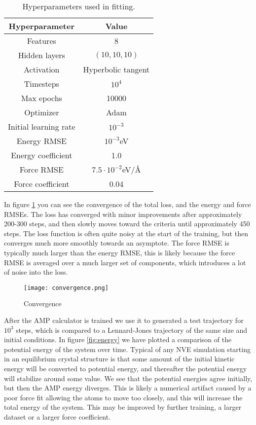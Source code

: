 \begin{table}[h]
\label{tab:hyperparam}
\caption{Hyperparameters used in fitting.}
\begin{center}
\begin{tabular}{|c c|}
\hline
Hyperparameter & Value \\
\hline \hline
Features & 8 \\
Hidden layers & $(10, 10, 10)$ \\
Activation & Hyperbolic tangent \\
Timesteps & $10^4$ \\
Max epochs & 10000 \\
Optimizer & Adam \\
Initial learning rate & $10^{-3}$ \\
Energy RMSE & $10^{-3}$eV \\
Energy coefficient & 1.0 \\
Force RMSE & $7.5\cdot10^{-2}$eV/Å \\
Force coefficient & 0.04 \\
\hline
\end{tabular}
\end{center}
\end{table}

In figure \ref{fig:convergence} you can see the convergence of the total
loss, and the energy and force RMSEs. The loss has converged
with minor improvements after approximately 200-300 steps,
and then slowly moves toward the criteria until approximately 450 steps.
The loss function is often
quite noisy at the start of the training, but then converges much more
smoothly towards an asymptote. The force RMSE is typically much
larger than the energy RMSE, this is likely because the force RMSE
is averaged over a much larger set of components, which introduces
a lot of noise into the loss.

\begin{figure}[h]
    \centering
    \texttt{[image: convergence.png]}
    \caption{Convergence}
    \label{fig:convergence}
\end{figure}

After the AMP calculator is trained we use it to generated a 
test trajectory for $10^3$ steps, which is compared to a Lennard-Jones
trajectory of the same size and initial conditions.
In figure \ref{fig:energy} we have plotted a comparison of the
potential energy of the system over time. Typical of any NVE simulation
starting in an equilibrium crystal structure is that some amount of
the initial kinetic energy will be converted to potential energy,
and thereafter the potential energy will stabilize around some value.
We see that the potential energies agree initially, but then the AMP
energy diverges. This is likely a numerical artifact caused by
a poor force fit allowing the atoms to move too closely, and
this will increase the total energy of the system.
This may be improved by further training, a larger dataset or a larger force
coefficient.
\par

